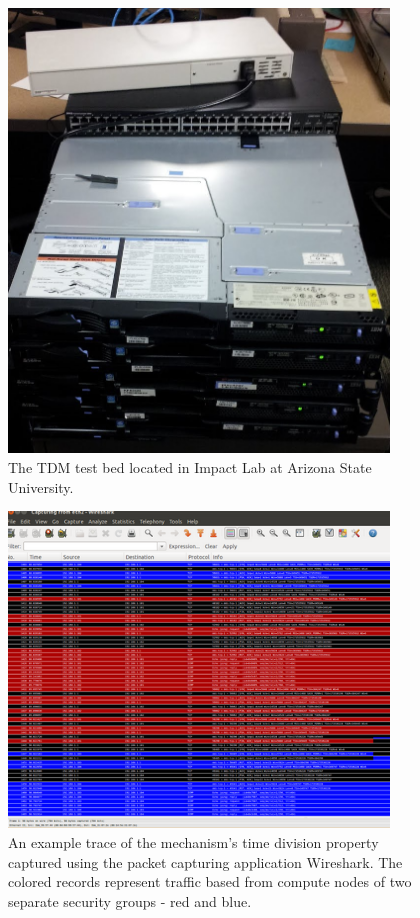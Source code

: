 \documentclass[oneside,12pt]{memoir}
\begin{document}
\begin{figure}
  \begin{center}
    \includegraphics[width=0.9\textwidth]{test_bed.jpg}
  \end{center}
  \caption{The TDM test bed located in Impact Lab at Arizona State University.}
\label{fig:test_bed}
\end{figure}
    
    
\begin{figure}
  \begin{center}
    \includegraphics[width=0.9\textwidth]{wireshark.jpg}
  \end{center}
  \caption{An example trace of the mechanism's time division property captured using the packet capturing application Wireshark. The colored records represent traffic based from compute nodes of two separate security groups - red and blue.}
\label{fig:wireshark}
\end{figure}
\end{document}
